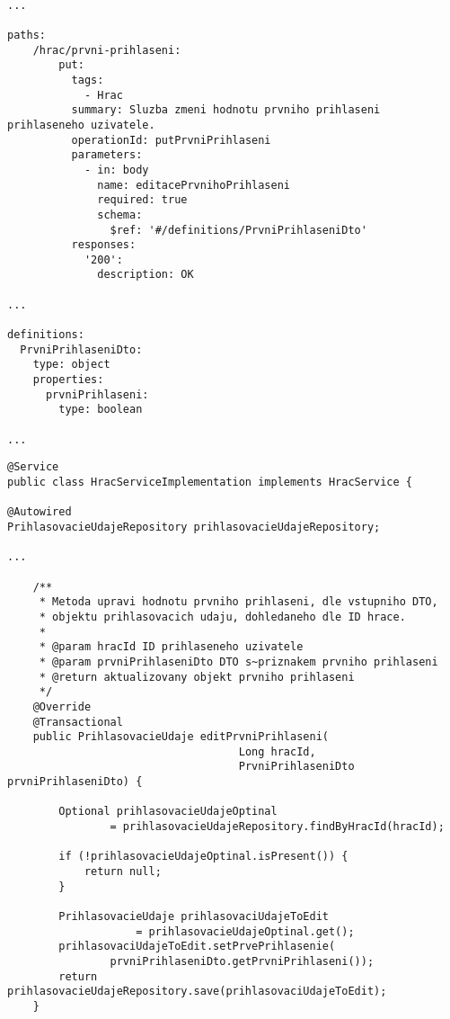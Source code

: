 \documentclass[twoside, 12pt]{article}
\begin{document}
{{\begin{lstlisting}

...

paths:
    /hrac/prvni-prihlaseni:
        put:
          tags:
            - Hrac
          summary: Sluzba zmeni hodnotu prvniho prihlaseni prihlaseneho uzivatele.
          operationId: putPrvniPrihlaseni
          parameters:
            - in: body
              name: editacePrvnihoPrihlaseni
              required: true
              schema:
                $ref: '#/definitions/PrvniPrihlaseniDto'
          responses:
            '200':
              description: OK

...

definitions:
  PrvniPrihlaseniDto:
    type: object
    properties:
      prvniPrihlaseni:
        type: boolean

...

\end{lstlisting}

\clearpage


\begin{lstlisting}
@Service
public class HracServiceImplementation implements HracService {

@Autowired
PrihlasovacieUdajeRepository prihlasovacieUdajeRepository;

...

    /**
     * Metoda upravi hodnotu prvniho prihlaseni, dle vstupniho DTO,
     * objektu prihlasovacich udaju, dohledaneho dle ID hrace.
     *
     * @param hracId ID prihlaseneho uzivatele
     * @param prvniPrihlaseniDto DTO s~priznakem prvniho prihlaseni
     * @return aktualizovany objekt prvniho prihlaseni
     */
    @Override
    @Transactional
    public PrihlasovacieUdaje editPrvniPrihlaseni(
                                    Long hracId,
                                    PrvniPrihlaseniDto prvniPrihlaseniDto) {

        Optional prihlasovacieUdajeOptinal
                = prihlasovacieUdajeRepository.findByHracId(hracId);

        if (!prihlasovacieUdajeOptinal.isPresent()) {
            return null;
        }

        PrihlasovacieUdaje prihlasovaciUdajeToEdit
                    = prihlasovacieUdajeOptinal.get();
        prihlasovaciUdajeToEdit.setPrvePrihlasenie(
                prvniPrihlaseniDto.getPrvniPrihlaseni());
        return prihlasovacieUdajeRepository.save(prihlasovaciUdajeToEdit);
    }


\end{lstlisting}}}
\end{document}
